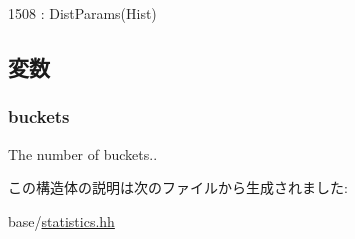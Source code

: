 \begin{DoxyCode}
1508 : DistParams(Hist) {}
\end{DoxyCode}


\subsection{変数}
\hypertarget{structStats_1_1HistStor_1_1Params_a94003530caa509b59d5355518e0ac58b}{
\subsubsection[{buckets}]{ {\bf buckets}}}
\label{structStats_1_1HistStor_1_1Params_a94003530caa509b59d5355518e0ac58b}
The number of buckets.. 

この構造体の説明は次のファイルから生成されました:\begin{DoxyCompactItemize}
\item 
base/\hyperlink{statistics_8hh}{statistics.hh}\end{DoxyCompactItemize}
